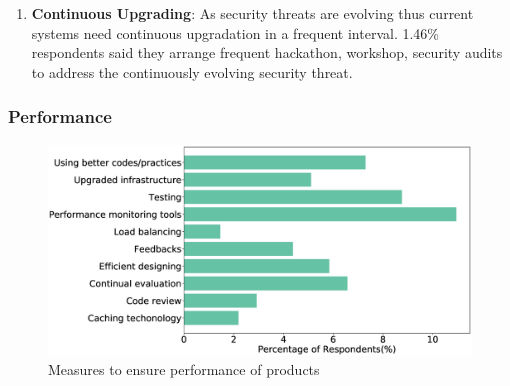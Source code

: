 \begin{enumerate}
    \item \textbf{Continuous Upgrading}: As security threats are evolving thus current systems need continuous upgradation in a frequent interval. 1.46\% respondents said they arrange frequent hackathon, workshop, security audits to address the continuously evolving security threat.
    

   
\end{enumerate}

\subsubsection{Performance}
\label{Performance}
\begin{figure}[htbp]
\includegraphics[scale=0.28]{Figures/Performance.eps} 
\caption{Measures to ensure performance of products}
\label{fig:Measures to ensure performance}
\end{figure}
